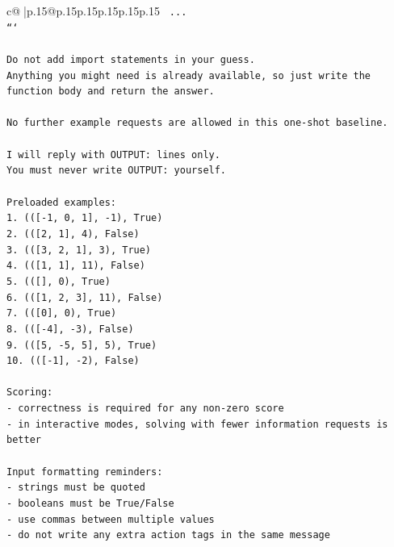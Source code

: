 \documentclass{article}
\begin{document}
{\begin{supertabular}{c@{$\;$}|p{.15\linewidth}@{}p{.15\linewidth}p{.15\linewidth}p{.15\linewidth}p{.15\linewidth}p{.15\linewidth}}
{{{\texttt{    ...} \\
\texttt{```} \\
\\ 
\texttt{Do not add import statements in your guess.} \\
\texttt{Anything you might need is already available, so just write the function body and return the answer.} \\
\\ 
\texttt{No further example requests are allowed in this one{-}shot baseline.} \\
\\ 
\texttt{I will reply with OUTPUT: lines only.} \\
\texttt{You must never write OUTPUT: yourself.} \\
\\ 
\texttt{Preloaded examples:} \\
\texttt{1. (({[}{-}1, 0, 1{]}, {-}1), True)} \\
\texttt{2. (({[}2, 1{]}, 4), False)} \\
\texttt{3. (({[}3, 2, 1{]}, 3), True)} \\
\texttt{4. (({[}1, 1{]}, 11), False)} \\
\texttt{5. (({[}{]}, 0), True)} \\
\texttt{6. (({[}1, 2, 3{]}, 11), False)} \\
\texttt{7. (({[}0{]}, 0), True)} \\
\texttt{8. (({[}{-}4{]}, {-}3), False)} \\
\texttt{9. (({[}5, {-}5, 5{]}, 5), True)} \\
\texttt{10. (({[}{-}1{]}, {-}2), False)} \\
\\ 
\texttt{Scoring:} \\
\texttt{{-} correctness is required for any non{-}zero score} \\
\texttt{{-} in interactive modes, solving with fewer information requests is better} \\
\\ 
\texttt{Input formatting reminders:} \\
\texttt{{-} strings must be quoted} \\
\texttt{{-} booleans must be True/False} \\
\texttt{{-} use commas between multiple values} \\
\texttt{{-} do not write any extra action tags in the same message} \\
\\ 
}}}
\end{supertabular}}
\end{document}
